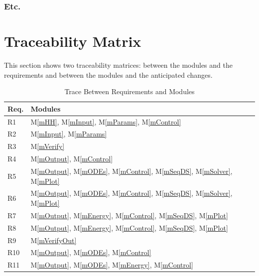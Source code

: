 \documentclass[12pt, titlepage]{article}
\newcommand{\mref}[1]{M\ref{#1}}
\begin{document}
\subsubsection{Etc.}

\section{Traceability Matrix} \label{SecTM}

This section shows two traceability matrices: between the modules and the
requirements and between the modules and the anticipated changes.

\begin{table}[H]
\centering
\begin{tabular}{p{} p{}}
\toprule
\textbf{Req.} & \textbf{Modules}\\
\midrule
R1 & \mref{mHH}, \mref{mInput}, \mref{mParams}, \mref{mControl}\\
R2 & \mref{mInput}, \mref{mParams}\\
R3 & \mref{mVerify}\\
R4 & \mref{mOutput}, \mref{mControl}\\
R5 & \mref{mOutput}, \mref{mODEs}, \mref{mControl}, \mref{mSeqDS}, \mref{mSolver}, \mref{mPlot}\\
R6 & \mref{mOutput}, \mref{mODEs}, \mref{mControl}, \mref{mSeqDS}, \mref{mSolver}, \mref{mPlot}\\
R7 & \mref{mOutput}, \mref{mEnergy}, \mref{mControl}, \mref{mSeqDS}, \mref{mPlot}\\
R8 & \mref{mOutput}, \mref{mEnergy}, \mref{mControl}, \mref{mSeqDS}, \mref{mPlot}\\
R9 & \mref{mVerifyOut}\\
R10 & \mref{mOutput}, \mref{mODEs}, \mref{mControl}\\
R11 & \mref{mOutput}, \mref{mODEs}, \mref{mEnergy}, \mref{mControl}\\
\bottomrule
\end{tabular}
\caption{Trace Between Requirements and Modules}
\label{TblRT}
\end{table}
\end{document}
